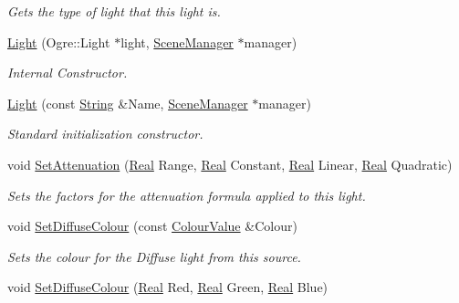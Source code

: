 \begin{DoxyCompactItemize}
\begin{DoxyCompactList}\small\item\em Gets the type of light that this light is. \item\end{DoxyCompactList}\item 
\hyperlink{classMezzanine_1_1Light_a78f9b77376839f757826336bf8f93f00}{Light} (Ogre::Light $\ast$light, \hyperlink{classMezzanine_1_1SceneManager}{SceneManager} $\ast$manager)
\begin{DoxyCompactList}\small\item\em Internal Constructor. \item\end{DoxyCompactList}\item 
\hyperlink{classMezzanine_1_1Light_a22277def5a6adfa4ad0c510faa08f90a}{Light} (const \hyperlink{namespaceMezzanine_acf9fcc130e6ebf08e3d8491aebcf1c86}{String} \&Name, \hyperlink{classMezzanine_1_1SceneManager}{SceneManager} $\ast$manager)
\begin{DoxyCompactList}\small\item\em Standard initialization constructor. \item\end{DoxyCompactList}\item 
void \hyperlink{classMezzanine_1_1Light_adcac90175a780d07564a41648c22892c}{SetAttenuation} (\hyperlink{namespaceMezzanine_a726731b1a7df72bf3583e4a97282c6f6}{Real} Range, \hyperlink{namespaceMezzanine_a726731b1a7df72bf3583e4a97282c6f6}{Real} Constant, \hyperlink{namespaceMezzanine_a726731b1a7df72bf3583e4a97282c6f6}{Real} Linear, \hyperlink{namespaceMezzanine_a726731b1a7df72bf3583e4a97282c6f6}{Real} Quadratic)
\begin{DoxyCompactList}\small\item\em Sets the factors for the attenuation formula applied to this light. \item\end{DoxyCompactList}\item 
void \hyperlink{classMezzanine_1_1Light_a577e92239a463c40207dc749b3f6c14a}{SetDiffuseColour} (const \hyperlink{classMezzanine_1_1ColourValue}{ColourValue} \&Colour)
\begin{DoxyCompactList}\small\item\em Sets the colour for the Diffuse light from this source. \item\end{DoxyCompactList}\item 
void \hyperlink{classMezzanine_1_1Light_a6f669a5d25e6c9b40be8656606da854c}{SetDiffuseColour} (\hyperlink{namespaceMezzanine_a726731b1a7df72bf3583e4a97282c6f6}{Real} Red, \hyperlink{namespaceMezzanine_a726731b1a7df72bf3583e4a97282c6f6}{Real} Green, \hyperlink{namespaceMezzanine_a726731b1a7df72bf3583e4a97282c6f6}{Real} Blue)

\end{DoxyCompactItemize}
